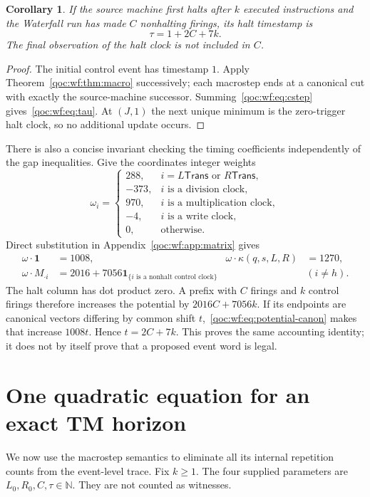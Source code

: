 \documentclass[11pt,letterpaper]{article}
\newtheorem{corollary}[theorem]{Corollary}
\theoremstyle{definition}
\theoremstyle{remark}
\newcommand{\N}{\mathbb N}
\newcommand{\one}{\mathbf 1}
\newcommand{\ind}[1]{\mathbf 1_{\{#1\}}}
\newcommand{\clk}[1]{\mathsf{#1}}
\newcommand{\cani}{\kappa}
\begin{document}
\begin{corollary}\label{qoc:wf:cor:time}
If the source machine first halts after $k$ executed instructions and the Waterfall run has made $C$ nonhalting firings, its halt timestamp is
\begin{equation}\label{qoc:wf:eq:tau}
 \tau=1+2C+7k.
\end{equation}
The final observation of the halt clock is not included in $C$.
\end{corollary}
\begin{proof}
The initial control event has timestamp $1$. Apply Theorem~\ref{qoc:wf:thm:macro} successively; each macrostep ends at a canonical cut with exactly the source-machine successor. Summing~\eqref{qoc:wf:eq:cstep} gives~\eqref{qoc:wf:eq:tau}. At $(J,1)$ the next unique minimum is the zero-trigger halt clock, so no additional update occurs.
\end{proof}

There is also a concise invariant checking the timing coefficients independently of the gap inequalities. Give the coordinates integer weights
\begin{equation}\label{qoc:wf:eq:weights}
 \omega_i=\begin{cases}
 288,&i=L\clk{Trans}\text{ or }R\clk{Trans},\\
 -373,&i\text{ is a division clock},\\
 970,&i\text{ is a multiplication clock},\\
 -4,&i\text{ is a write clock},\\
 0,&\text{otherwise}.
 \end{cases}
\end{equation}
Direct substitution in Appendix~\ref{qoc:wf:app:matrix} gives
\begin{align}
 \omega\cdot\one&=1008,&
 \omega\cdot\cani(q,s,L,R)&=1270,\label{qoc:wf:eq:potential-canon}\\
 \omega\cdot M_{\cdot i}&=2016+7056\ind{i\text{ is a nonhalt control clock}}
 &&(i\ne h).\label{qoc:wf:eq:potential-triggers}
\end{align}
The halt column has dot product zero. A prefix with $C$ firings and $k$ control firings therefore increases the potential by $2016C+7056k$. If its endpoints are canonical vectors differing by common shift $t$,~\eqref{qoc:wf:eq:potential-canon} makes that increase $1008t$. Hence $t=2C+7k$. This proves the same accounting identity; it does not by itself prove that a proposed event word is legal.

\section{One quadratic equation for an exact TM horizon}\label{qoc:wf:sec:quadratic}
We now use the macrostep semantics to eliminate all its internal repetition counts from the event-level trace. Fix $k\ge1$. The four supplied parameters are $L_0,R_0,C,\tau\in\N$. They are not counted as witnesses.
\end{document}
